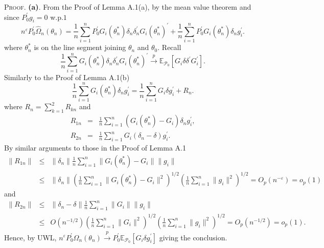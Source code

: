 \documentclass[hidelinks, 11 pt, a4paper, pdflatex]{article}
\begin{document}
{  \textsc{Proof}. \textbf{(a)}. From the Proof of Lemma A.1(a), by the mean value theorem and since $P_{0}^{\prime}g_{i} = 0$ w.p.$1$
   \[
    n^{\varepsilon }P_{0}^{\prime}\hat{\Omega}_{n}(\theta_{n}) = \frac{1}{n} \sum_{i=1}^{n} P_{0}^{\prime}G_{i}(\theta_{n}^{\ast})\delta_{n}
                                                                 \delta_{n}^{\prime}G_{i}(\theta_{n}^{\ast})^{\prime}
                                                                 + \frac{1}{n} \sum_{i=1}^{n} P_{0}^{\prime}G_{i}(\theta_{n}^{\ast})\delta_{n}g_{i}^{\prime}.
   \]%
  where $\theta_{n}^{\ast}$ is on the line segment joining $\theta_{n}$ and $\theta_{0}$. Recall
   \[
    \frac{1}{n} \sum_{i=1}^{n} G_{i}(\theta_{n}^{\ast})\delta_{n} \delta_{n}^{\prime}G_{i}(\theta_{n}^{\ast})^{\prime} \overset{p}{\rightarrow} \mathbb{E}_{\mathcal{P}_{0}}[G_{i}\delta \delta^{\prime}G_{i}^{\prime}].
   \]
  Similarly to the Proof of Lemma A.1(b)
   \[
    \frac{1}{n} \sum_{i=1}^{n} G_{i}(\theta_{n}^{\ast})\delta_{n}g_{i}^{\prime} = \frac{1}{n} \sum_{i=1}^{n} G_{i}\delta g_{i}^{\prime} + R_{n}.
   \]
  where $R_{n} = \sum_{k=1}^{2}R_{kn}$ and
   \begin{eqnarray*}
    R_{1n} & = & \frac{1}{n} \sum_{i=1}^{n} (G_{i}(\theta _{n}^{\ast}) - G_{i})\delta_{n}g_{i}^{\prime}, \\
    R_{2n} & = & \frac{1}{n} \sum_{i=1}^{n} G_{i}(\delta _{n} - \delta)g_{i}^{\prime}.
   \end{eqnarray*}%
  By similar arguments to those in the Proof of Lemma A.1
   \begin{eqnarray*}
    \|R_{1n}\| & \leq & \|\delta_{n}\| \frac{1}{n} \sum_{i=1}^{n} \|G_{i}(\theta_{n}^{\ast}) - G_{i}\| \|g_{i}\| \\
               & \leq & \|\delta_{n}\| (\frac{1}{n} \sum_{i=1}^{n} \|G_{i}(\theta_{n}^{\ast}) - G_{i}\|^{2})^{1/2}
                        (\frac{1}{n} \sum_{i=1}^{n} \|g_{i}\|^{2})^{1/2} = O_{p}(n^{-\varepsilon}) = o_{p}(1)
   \end{eqnarray*}%
  and
   \begin{eqnarray*}
    \|R_{2n}\| & \leq & \|\delta_{n} - \delta\| \frac{1}{n} \sum_{i=1}^{n} \|G_{i}\| \|g_{i}\| \\
               & \leq & O(n^{-1/2}) (\frac{1}{n} \sum_{i=1}^{n} \|G_{i}\|^{2})^{1/2} (\frac{1}{n} \sum_{i=1}^{n} \|g_{i}\|^{2})^{1/2} = O_{p}(n^{-1/2}) = o_{p}(1).
   \end{eqnarray*}%
  Hence, by UWL, $n^{\varepsilon}P_{0}^{\prime}\hat{\Omega}_{n}(\theta _{n}) \overset{p}{\rightarrow} P_{0}^{\prime} \mathbb{E}_{\mathcal{P}_{0}}[G_{i}\delta g_{i}^{\prime}]$ giving the conclusion. \\

}
\end{document}
